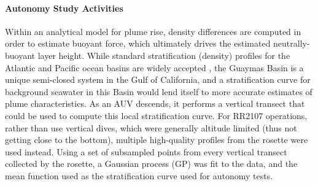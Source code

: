 \paragraph{Autonomy Study Activities}
Within an analytical model for plume rise, density differences are computed in order to estimate buoyant force, which ultimately drives the estimated neutrally-buoyant layer height.
While standard stratification (density) profiles for the Atlantic and Pacific ocean basins are widely accepted \autocite{speer1989model}, the Guaymas Basin is a unique semi-closed system in the Gulf of California, and a stratification curve for background seawater in this Basin would lend itself to more accurate estimates of plume characteristics. As an AUV descends, it performs a vertical transect that could be used to compute this local stratification curve. For RR2107 operations, rather than use \Sentry vertical dives, which were generally altitude limited (thus not getting close to the bottom), multiple high-quality profiles from the rosette were used instead. Using a set of subsampled points from every vertical transect collected by the rosette, a Gaussian process (GP) was fit to the data, and the mean function used as the stratification curve used for autonomy tests.

